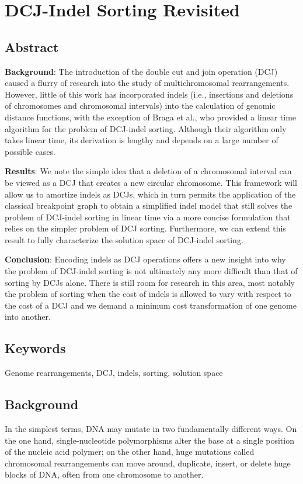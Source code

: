 \chapter{DCJ-Indel Sorting Revisited}

\section{Abstract}        %
{\bf Background}: The introduction of the double cut and join operation (DCJ) caused a flurry of research into the study of multichromosomal rearrangements.  However, little of this work has incorporated indels (i.e., insertions and deletions of chromosomes and chromosomal intervals) into the calculation of genomic distance functions, with the exception of Braga et al., who provided a linear time algorithm for the problem of DCJ-indel sorting.  Although their algorithm only takes linear time, its derivation is lengthy and depends on a large number of possible cases.  

{\bf Results}:  We note the simple idea that a deletion of a chromosomal interval can be viewed as a DCJ that creates a new circular chromosome.  This framework will allow us to amortize indels as DCJs, which in turn permits the application of the classical breakpoint graph to obtain a simplified indel model that still solves the problem of DCJ-indel sorting in linear time via a more concise formulation that relies on the simpler problem of DCJ sorting.  Furthermore, we can extend this result to fully characterize the solution space of DCJ-indel sorting.

{\bf Conclusion}: Encoding indels as DCJ operations offers a new insight into why the problem of DCJ-indel sorting is not ultimately any more difficult than that of sorting by DCJs alone.  There is still room for research in this area, most notably the problem of sorting when the cost of indels is allowed to vary with respect to the cost of a DCJ and we demand a minimum cost transformation of one genome into another.

\section*{Keywords}

Genome rearrangements, DCJ, indels, sorting, solution space


\section*{Background}
In the simplest terms, DNA may mutate in two fundamentally different ways.  On the one hand, single-nucleotide polymorphisms alter the base at a single position of the nucleic acid polymer; on the other hand, huge mutations called chromosomal rearrangements can move around, duplicate, insert, or delete huge blocks of DNA, often from one chromosome to another.

